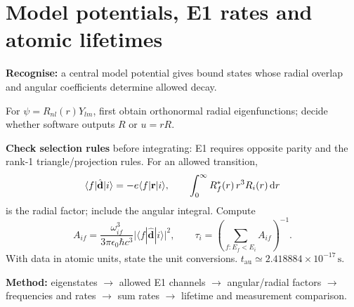
\section{Model potentials, E1 rates and atomic lifetimes}
\textbf{Recognise:} a central model potential gives bound states
whose radial overlap and angular coefficients determine allowed decay.

For \(\psi=R_{nl}(r)Y_{lm}\), first obtain orthonormal
radial eigenfunctions; decide whether software outputs \(R\) or \(u=rR\).

\textbf{Check selection rules} before integrating:
E1 requires opposite parity and the rank-1 triangle/projection rules.
For an allowed transition,
\[
\langle f|\hat{\mathbf d}|i\rangle=-e\langle f|\mathbf r|i\rangle,
\qquad
\int_0^\infty R_f^*(r)\,r^3R_i(r)\,\mathrm{d} r
\]
is the radial factor; include the angular integral.
Compute
\[
A_{if}=\frac{\omega_{if}^{3}}{3\pi\epsilon_0\hbar c^3}
\big|\langle f|\hat{\mathbf d}|i\rangle\big|^2,
\qquad
\tau_i=\left(\sum_{f:E_f<E_i}A_{if}\right)^{-1}.
\]
With data in atomic units, state the unit conversions.
\(t_{\mathrm{au}}\simeq2.418884\times10^{-17}\,\mathrm{s}\).
\begin{methodbox}
\textbf{Method:} eigenstates \(\to\) allowed E1 channels
\(\to\) angular/radial factors \(\to\) frequencies and rates
\(\to\) sum rates \(\to\) lifetime and measurement comparison.
\end{methodbox}
